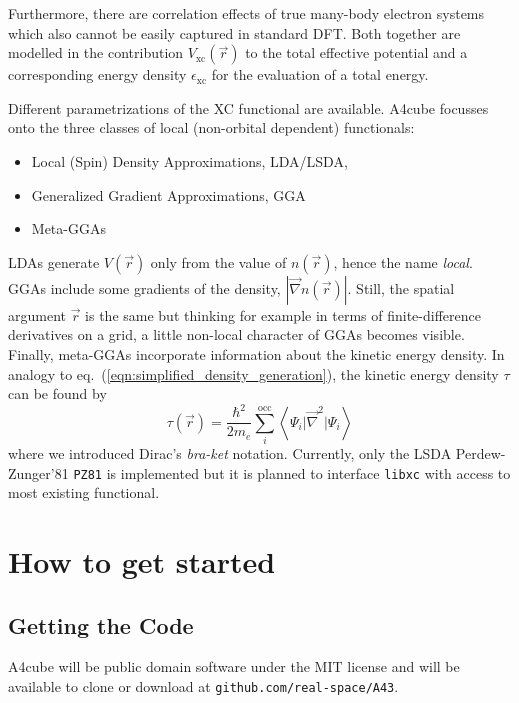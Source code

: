 \documentclass[oribibl]{llncs}
\newcommand{\um}[1]{_{\mathrm{#1}}}
\newcommand{\ttt}[1]{\texttt{#1}}
\newcommand{\braketop}[3]{\left\langle \left. #1 \right| #2 \left| #3 \right. \right\rangle}
\newcommand{\codename}{A4cube}
\begin{document}
Furthermore, there are correlation effects of true many-body electron systems
which also cannot be easily captured in standard \ac{DFT}.
Both together are modelled in the contribution $V\um{xc}(\vec r)$ 
to the total effective potential and a corresponding energy density $\epsilon\um{xc}$ for the evaluation of a total energy.

Different parametrizations of the \ac{XC} functional are available.
\codename{} focusses onto the three classes of local (non-orbital dependent) functionals: 
\begin{itemize}
	\item Local (Spin) Density Approximations, LDA/LSDA, 
	\item Generalized Gradient Approximations, GGA
	\item Meta-GGAs
\end{itemize}
LDAs generate $V(\vec r)$ only from the value of $n(\vec r)$, 
hence the name \emph{local}. 
GGAs include some gradients of the density, $|\vec \nabla n(\vec r)|$.
Still, the spatial argument $\vec r$ is the same but thinking for example
in terms of finite-difference derivatives on a grid, 
a little non-local character of GGAs becomes visible.
Finally, meta-GGAs incorporate information about the kinetic energy density.
In analogy to eq.~(\ref{eqn:simplified_density_generation}), the kinetic energy density $\tau$ can be found by
\begin{equation}
	\tau(\vec r) = \frac{\hbar^2}{2m_e} \sum_i^{\mathrm{occ}} \braketop{ \Psi_i } {\vec \nabla^2 } { \Psi_i } 
	\label{eqn:simplified_kinetic_energy_density_generation}
\end{equation}
where we introduced Dirac's \emph{bra-ket} notation.
Currently, only the LSDA Perdew-Zunger'81 \ttt{PZ81} is implemented 
but it is planned to interface \ttt{libxc} with access to most existing functional.



\section{How to get started}

\subsection{Getting the Code}
\codename{} will be public domain software under the MIT license
and will be available to clone or download at \ttt{github.com/real-space/A43}. 
\end{document}
